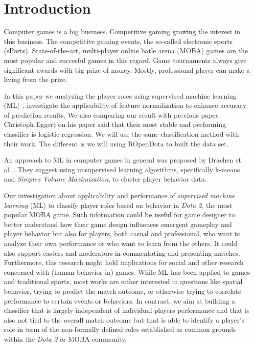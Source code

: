 \section{Introduction}

Computer games is a big business. Competitive gaming growing the interest in this business. The competitive gaming events, the so-called electronic sports (sPorts). State-of-the-art, multi-player online batle arena (MOBA) games are the most popular and succesful games in this regard. Game tournaments always give significant awards with big prize of money. Mostly, professional player can make a living from the prize. 

In this paper we analyzing the player roles using supervised machine learning (ML) , investigate the applicability of feature normalization to enhance accuracy of prediction results. We also comparing our result with previous paper. Christoph Eggert on his paper said that their most stable and performing classifier is logistic regression. We will use the same classification method with their work. The different is we will using ROpenDota to built the data set.

An approach to ML in computer games in general was proposed by Drachen et al.\cite{drachen2014skill} . They suggest using unsupervised learning algorithms, specifically k-means and \textit{Simplex Volume Maximization}, to cluster player behavior data.

Our investigation about applicability and performance of \textit{supervised machine learning} (ML) to classify player roles based on behavior in \textit{Dota 2}, the most popular MOBA game. Such information could be useful for game designer to better understand how their game design influences emergent gameplay and player behavior but also for players, both casual and professional, who want to analyze their own performance or who want to learn from the others. It could also support casters and moderators in commentating and presenting matches. Furthermore, this research might hold implications for social and other research concerned with (human behavior in) games. While ML has been applied to games and traditional sports, most works are either interested in questions like spatial behavior, trying to predict the match outcome, or otherwise trying to correlate performance to certain events or behaviors. In contrast, we aim at building a classifier that is largely independent of individual players performance and that is also not tied to the overall match outcome but that is able to identify a player's role in term of the non-formally defined roles established as common grounds within the \textit{Dota 2} or MOBA community.

